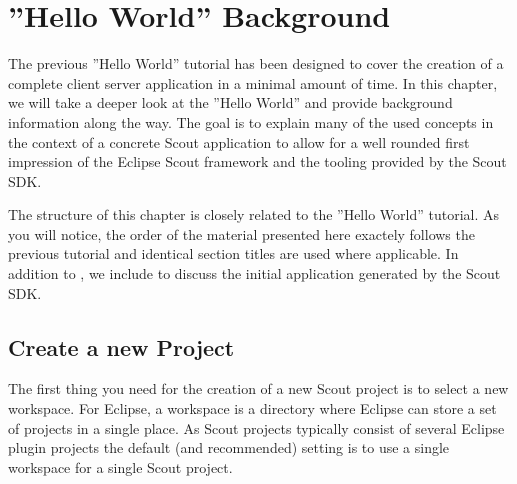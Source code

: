 \documentclass[a4paper,10pt,twoside]{book}
\begin{document}
\chapter{''Hello World'' Background}

The previous ''Hello World'' tutorial has been designed to cover the creation of a complete client server application in a minimal amount of time.
In this chapter, we will take a deeper look at the ''Hello World'' and provide background information along the way.
The goal is to explain many of the used concepts in the context of a concrete Scout application to allow for a well rounded first impression of the Eclipse Scout framework and the tooling provided by the Scout SDK.

The structure of this chapter is closely related to the ''Hello World'' tutorial.
As you will notice, the order of the material presented here exactely follows the previous tutorial and identical section titles are used where applicable.
In addition to , we include  to discuss the initial application generated by the Scout SDK.

\section{Create a new Project}

The first thing you need for the creation of a new Scout project is to select a new workspace.
For Eclipse, a workspace is a directory where Eclipse can store a set of projects in a single place.
As Scout projects typically consist of several Eclipse plugin projects the default (and recommended) setting is to use a single workspace for a single Scout project.
\end{document}
